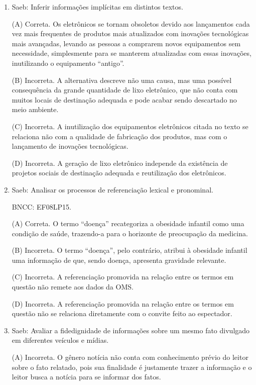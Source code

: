 \begin{enumerate}

	\item

	Saeb: Inferir informações implícitas em distintos textos.

(A) Correta. Os eletrônicos se tornam obsoletos devido aos lançamentos
cada vez mais frequentes de produtos mais atualizados com inovações
tecnológicas mais avançadas, levando as pessoas a comprarem novos
equipamentos sem necessidade, simplesmente para se manterem atualizadas
com essas inovações, inutilizando o equipamento ``antigo''.

(B) Incorreta. A alternativa descreve não uma causa, mas uma possível
consequência da grande quantidade de lixo eletrônico, que não conta com
muitos locais de destinação adequada e pode acabar sendo descartado no
meio ambiente.

(C) Incorreta. A inutilização dos equipamentos eletrônicos citada no
texto se relaciona não com a qualidade de fabricação dos produtos, mas
com o lançamento de inovações tecnológicas.

(D) Incorreta. A geração de lixo eletrônico independe da existência de
projetos sociais de destinação adequada e reutilização dos eletrônicos.

\item

Saeb: Analisar os processos de referenciação lexical e pronominal.

BNCC: EF08LP15.

(A) Correta. O termo ``doença'' recategoriza a obesidade infantil como
uma condição de saúde, trazendo-a para o horizonte de preocupação da
medicina.

(B) Incorreta. O termo ``doença'', pelo contrário, atribui à obesidade
infantil uma informação de que, sendo doença, apresenta gravidade relevante.

(C) Incorreta. A referenciação promovida na relação entre os termos em
questão não remete aos dados da OMS.

(D) Incorreta. A referenciação promovida na relação entre os termos em
questão não se relaciona diretamente com o convite feito ao espectador.

\item

Saeb: Avaliar a fidedignidade de informações sobre um mesmo fato
divulgado em diferentes veículos e mídias.

(A) Incorreta. O gênero notícia não conta com conhecimento prévio do
leitor sobre o fato relatado, pois sua finalidade é justamente trazer a
informação e o leitor busca a notícia para se informar dos fatos.


\end{enumerate}
